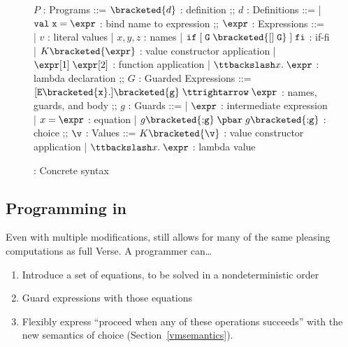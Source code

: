 \documentclass[manuscript,screen,review, 12pt, nonacm]{acmart}
\begin{document}
        \begin{figure}[H]
          \begin{center}
              \begin{bnf}
              $P$ : \textsf{Programs} ::=
              $\bracketed{d}$ : definition
              ;;
              $d$ : \textsf{Definitions} ::=
              | $\tt{val}\; x\; \tt{=}\; \expr$ : bind name to expression
              ;;
              $\expr$ : \textsf{Expressions} ::=
              | $v$ : literal values 
              | $x, y, z$ : names
              | $\tt{if}\; [\; G\; \bracketed{\tt{[]}\; G}\;]\; \tt{fi}$ : if-fi 
              | $K \bracketed{\expr}$ : value constructor application 
              | $\expr[1]\; \expr[2]$ : function application 
              | $\ttbackslash x\tt{.}\; \expr$ : lambda declaration 
              ;;
              $G$ : \textsf{Guarded Expressions} ::=  
              $[\tt{E }{\bracketed{x}}{\tt{.}}] \bracketed{g} \;\ttrightarrow\; \expr$ : names, guards, and body
              ;;
              $g$ : \textsf{Guards} ::=  
              | $\expr$ : intermediate expression 
              | $x \;\tt{=}\; \expr$ : equation 
              | $ g \bracketed{\tt{;} g} \; \pbar \; g \bracketed{\tt{;} g}$ : choice 
              ;;
              $\v$ : Values ::= $K\bracketed{\v}$ : value constructor application 
              | $\ttbackslash x\tt{.}\; \expr$ : lambda value
              \end{bnf}
          \end{center}
              \caption{\VMinus: Concrete syntax}
              \label{fig:vmsyntax}
              \end{figure}      

    \subsection{Programming in \VMinus}

    Even with multiple modifications, \VMinus still allows for many of the same
    pleasing computations as full Verse. A programmer can\dots
        \begin{enumerate}
            \item Introduce a set of equations, to be solved in a
            nondeterministic order 
            \item Guard expressions with those equations 
            \item Flexibly express “proceed when any of these operations
            succeeds” with the new semantics of choice
            (Section~\ref{vmsemantics}). 
        \end{enumerate}
\end{document}
